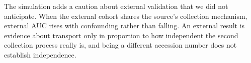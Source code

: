 The simulation adds a caution about external validation that we did not anticipate. When the external cohort shares the source's collection mechanism, external AUC rises with confounding rather than falling. An external result is evidence about transport only in proportion to how independent the second collection process really is, and being a different accession number does not establish independence.
